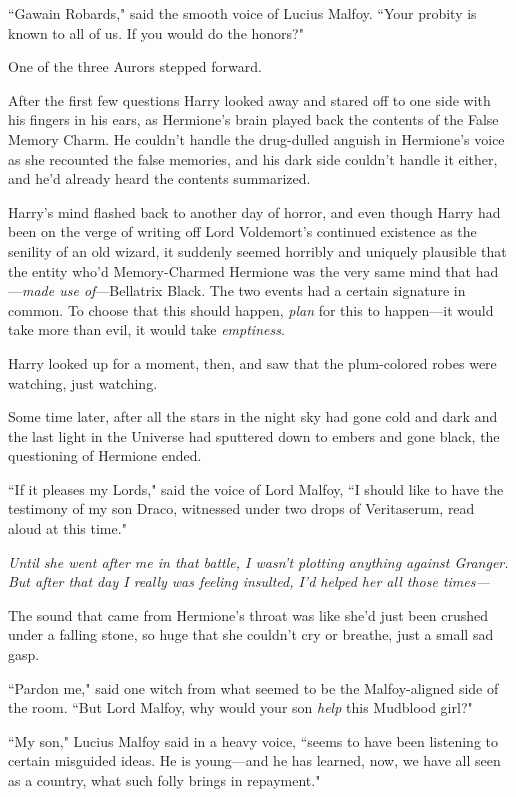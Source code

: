 ``Gawain Robards," said the smooth voice of Lucius Malfoy. ``Your probity is known to all of us. If you would do the honors?"

One of the three Aurors stepped forward.

After the first few questions Harry looked away and stared off to one side with his fingers in his ears, as Hermione's brain played back the contents of the False Memory Charm. He couldn't handle the drug-dulled anguish in Hermione's voice as she recounted the false memories, and his dark side couldn't handle it either, and he'd already heard the contents summarized.

Harry's mind flashed back to another day of horror, and even though Harry had been on the verge of writing off Lord Voldemort's continued existence as the senility of an old wizard, it suddenly seemed horribly and uniquely plausible that the entity who'd Memory-Charmed Hermione was the very same mind that had—\emph{made use of}—Bellatrix Black. The two events had a certain signature in common. To choose that this should happen, \emph{plan} for this to happen—it would take more than evil, it would take \emph{emptiness}.

Harry looked up for a moment, then, and saw that the plum-colored robes were watching, just watching.

Some time later, after all the stars in the night sky had gone cold and dark and the last light in the Universe had sputtered down to embers and gone black, the questioning of Hermione ended.

``If it pleases my Lords," said the voice of Lord Malfoy, ``I should like to have the testimony of my son Draco, witnessed under two drops of Veritaserum, read aloud at this time."

\emph{Until she went after me in that battle, I wasn't plotting anything against Granger. But after that day I really was feeling insulted, I'd helped her all those times—}

The sound that came from Hermione's throat was like she'd just been crushed under a falling stone, so huge that she couldn't cry or breathe, just a small sad gasp.

``Pardon me," said one witch from what seemed to be the Malfoy-aligned side of the room. ``But Lord Malfoy, why would your son \emph{help} this Mudblood girl?"

``My son," Lucius Malfoy said in a heavy voice, ``seems to have been listening to certain misguided ideas. He is young—and he has learned, now, we have all seen as a country, what such folly brings in repayment."

